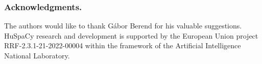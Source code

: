 \documentclass[runningheads,a4paper]{llncs}
\newcommand{\huspacy}{HuSpaCy}
\begin{document}
\subsubsection*{Acknowledgments.} The authors would like to thank Gábor Berend for his valuable suggestions.
\huspacy{} research and development is supported by the European Union project RRF-2.3.1-21-2022-00004 within the framework of the Artificial Intelligence National Laboratory. %



\end{document}
